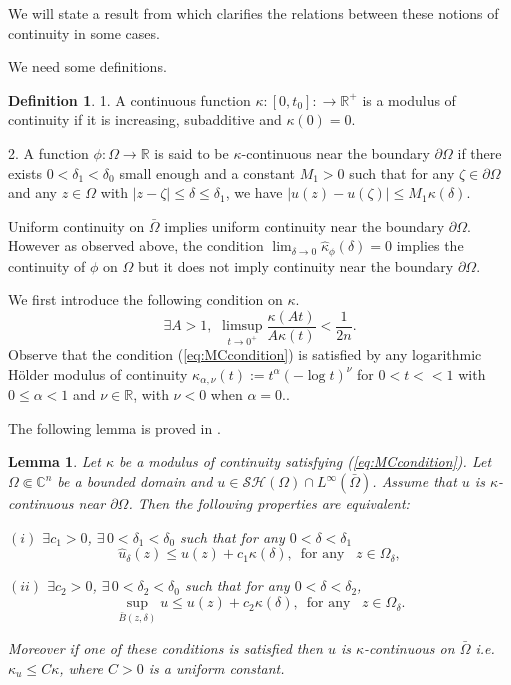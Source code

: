 \documentclass[12pt]{amsart}
\newtheorem{lemma}[theorem]{Lemma}
\theoremstyle{definition}
\newtheorem{definition}[theorem]{Definition}
\numberwithin{theorem}{section}
\numberwithin{equation}{section}
\newcommand{\R}{\mathbb{R}}
\newcommand{\C}{\mathbb{C}}
\begin{document}
We will state a result from \cite{Ze20}  which clarifies the relations between these notions of continuity in some cases.

We need some definitions. 
\begin{definition} 1.  A continuous  function $\kappa : [0,t_0] : \longrightarrow \R^+$ is a modulus of continuity if it is  increasing,  subadditive and $\kappa (0) =0$.

2. A function  $\phi : \Omega \longrightarrow \R$ is said to be $\kappa$-continuous near the boundary $\partial \Omega$ if there exists $0 < \delta_1 < \delta_0$ small enough and a constant $M_1 > 0$ such that for any $\zeta \in \partial \Omega$ and any $z \in \Omega$ with $\vert z - \zeta\vert \leq \delta \leq \delta_1$, we have $\vert u (z) - u(\zeta) \vert \leq M_1  \kappa (\delta)$.
\end{definition}
Uniform continuity on $\bar{\Omega}$ implies uniform continuity near the boundary $\partial \Omega$. However as observed above,  the condition $\lim_{\delta \to 0} \widehat{\kappa}_\phi (\delta) = 0$ implies the continuity of $\phi$ on $\Omega$ but it does not imply continuity near the boundary $\partial \Omega$.

 
We first introduce the following condition on $\kappa$.
\begin{equation} \label{eq:MCcondition}
\exists A > 1, \, \, \limsup_{t \to 0^+} \frac{\kappa (A t)}{A \kappa (t)} <  \frac{1}{2n}.
\end{equation}
Observe that  the condition (\ref{eq:MCcondition}) is satisfied by any logarithmic H\"older modulus of continuity $\kappa_{\alpha,\nu}  (t) := t^\alpha (-\log t)^{\nu}$ for $0 < t < < 1$ with $0\leq  \alpha < 1$ and $\nu \in \R$, with $\nu < 0$ when $\alpha =0$..

The following lemma  is proved in  \cite{Ze20}. 
\begin{lemma} \label{lem:sup-mean}  Let $\kappa$ be a modulus of continuity satisfying (\ref{eq:MCcondition}).  Let $\Omega \Subset \C^n$ be a bounded domain and $u \in  \mathcal{SH} (\Omega) \cap L^{\infty} ({\bar \Omega})$. Assume that $u$ is $\kappa$-continuous  near $\partial\Omega$. Then the following properties are equivalent:

$(i)$ $\exists c_1 >0$, $\exists  \, 0 < \delta_1 < \delta_0$ such that for any $0< \delta < \delta_1$
$$
\widehat{u}_\delta  (z)   \leq u  (z) +  c_1 \kappa (\delta), \, \, \, \text{for  any } \, \, \, z \in \Omega_\delta,
$$ 

$(ii)$ $\exists c_2 >0$, $\exists  \, 0 < \delta_2 < \delta_0$ such that for any $0< \delta < \delta_2$,
$$
\sup_{\bar B(z,\delta)} u \leq  u (z)+  c_2 \kappa (\delta),  \, \, \, \text{for  any } \, \, \, z \in \Omega_\delta.
$$

\smallskip

Moreover if one of these conditions is satisfied then $u$ is $\kappa$-continuous on $\bar{\Omega}$ i.e. $\kappa_u \leq C \kappa$, where $C > 0$ is a uniform constant.
\end{lemma}
 
\end{document}
